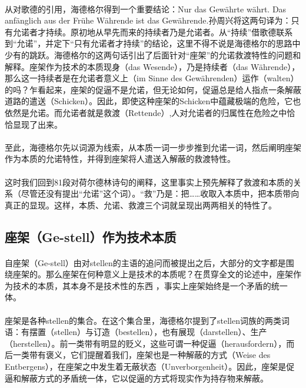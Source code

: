 \documentclass{article}
\begin{document}
		\paragraph{}
		从对歌德的引用，海德格尔得到一个重要结论：Nur das Gewährte währt. Das anfänglich aus der Frühe Währende ist das Gewährende.\cite{Frage_n_Tech}孙周兴将这两句译为：只有允诺者才持续。原初地从早先而来的持续者乃是允诺者。\cite[pg. 949]{slct_Hei_Szx}从“持续”借歌德联系到“允诺”，并定下“只有允诺者才持续”的结论，这里不得不说是海德格尔的思路中少有的跳跃。海德格尔的这两句话引出了后面针对“座架”的允诺救渡特性的问题和解释。座架作为技术的本质现身（das Wesende），乃是持续者（das Währende），那么这一持续者是在允诺者意义上（im Sinne des Gewährenden）运作（walten）的吗？\cite[pg. 949]{slct_Hei_Szx}乍看起来，座架的促逼不是允诺，但无论如何，促逼总是给人指点一条解蔽道路的遣送（Schicken）。因此，即使这种座架的Schicken中蕴藏极端的危险，它也依然是允诺。而允诺者就是救渡（Rettende）,人对允诺者的归属性在危险之中恰恰显现了出来。
		\paragraph{}
		至此，海德格尔先以词源为线索，从本质一词一步步推到允诺一词，然后阐明座架作为本质的允诺特性，并得到座架将人遣送入解蔽的救渡特性。
		\paragraph{}
		这时我们回到81段对荷尔德林诗句的阐释，这里事实上预先解释了救渡和本质的关系（尽管还没有提出“允诺”这个词）。“救”乃是：把……收取入本质中，把本质带向真正的显现。这样，本质、允诺、救渡三个词就呈现出两两相关的特性了。
	\subsection{座架（Ge-stell）作为技术本质}
		\paragraph{}
		自座架（Ge-stell）由对stellen的主语的追问而被提出之后，大部分的文字都是围绕座架的。那么座架在何种意义上是技术的本质呢？在贯穿全文的论述中，座架作为技术的本质，其本身不是技术性的东西 ，事实上座架始终是一个矛盾的统一体。
		\paragraph{}
		座架是各种stellen的集合。在这个集合里，海德格尔提到了stellen词族的两类词语：有摆置（stellen）与订造（bestellen），也有展现（darstellen）、生产（herstellen）。前一类带有明显的贬义，这些可谓一种促逼（herausfordern），而后一类带有褒义，它们提醒着我们，座架也是一种解蔽的方式（Weise des Entbergens），在座架之中发生着无蔽状态（Unverborgenheit）。因此，座架是促逼和解蔽方式的矛盾统一体，它以促逼的方式将现实作为持存物来解蔽。
\end{document}
